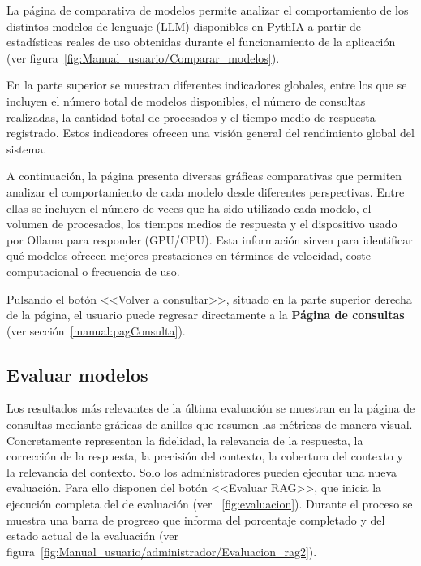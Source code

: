 La página de comparativa de modelos permite analizar el comportamiento de los distintos modelos de lenguaje (LLM) disponibles en PythIA a partir de estadísticas reales de uso obtenidas durante el funcionamiento de la aplicación (ver figura~\ref{fig:Manual_usuario/Comparar_modelos}).


En la parte superior se muestran diferentes indicadores globales, entre los que se incluyen el número total de modelos disponibles, el número de consultas realizadas, la cantidad total de  procesados y el tiempo medio de respuesta registrado. Estos indicadores ofrecen una visión general del rendimiento global del sistema.

A continuación, la página presenta diversas gráficas comparativas que permiten analizar el comportamiento de cada modelo desde diferentes perspectivas. Entre ellas se incluyen el número de veces que ha sido utilizado cada modelo, el volumen de  procesados, los tiempos medios de respuesta y el dispositivo usado por Ollama para responder (GPU/CPU). Esta información sirven para identificar qué modelos ofrecen mejores prestaciones en términos de velocidad, coste computacional o frecuencia de uso.

Pulsando el botón <<Volver a consultar>>, situado en la parte superior derecha de la página, el usuario puede regresar directamente a la \textbf{Página de consultas} (ver sección~\ref{manual:pagConsulta}).


\subsection{Evaluar modelos}
\label{manual:evaluar}

Los resultados más relevantes de la última evaluación se muestran en la página de consultas mediante gráficas de anillos que resumen las métricas de manera visual. Concretamente representan la fidelidad, la relevancia de la respuesta, la corrección de la respuesta, la precisión del contexto, la cobertura del contexto y la relevancia del contexto. Solo los administradores pueden ejecutar una nueva evaluación. Para ello disponen del botón <<Evaluar RAG>>, que inicia la ejecución completa del  de evaluación (ver ~\ref{fig:evaluacion}). Durante el proceso se muestra una barra de progreso que informa del porcentaje completado y del estado actual de la evaluación (ver figura~\ref{fig:Manual_usuario/administrador/Evaluacion_rag2}).

